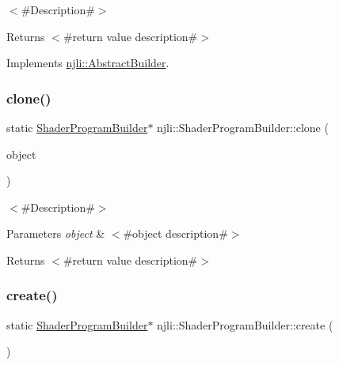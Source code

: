 $<$\#\+Description\#$>$

\begin{DoxyReturn}{Returns}
$<$\#return value description\#$>$ 
\end{DoxyReturn}


Implements \mbox{\hyperlink{classnjli_1_1_abstract_builder_aa1d220053e182c37b31b427499c6eacf}{njli\+::\+Abstract\+Builder}}.

\mbox{\label{classnjli_1_1_shader_program_builder_a539760d31d54d1c95c2fffc4c3fc3fbb}} 
\subsubsection{\texorpdfstring{clone()}{clone()}}
{\footnotesize\ttfamily static \mbox{\hyperlink{classnjli_1_1_shader_program_builder}{Shader\+Program\+Builder}}$\ast$ njli\+::\+Shader\+Program\+Builder\+::clone (\begin{DoxyParamCaption}\item[{const \mbox{\hyperlink{classnjli_1_1_shader_program_builder}{Shader\+Program\+Builder}} \&}]{object }\end{DoxyParamCaption})\hspace{0.3cm}{\ttfamily [static]}}

$<$\#\+Description\#$>$


\begin{DoxyParams}{Parameters}
{\em object} & $<$\#object description\#$>$\\
\hline
\end{DoxyParams}
\begin{DoxyReturn}{Returns}
$<$\#return value description\#$>$ 
\end{DoxyReturn}
\mbox{\label{classnjli_1_1_shader_program_builder_a29db7e71179718d1d22c76b4cd3db023}} 
\subsubsection{\texorpdfstring{create()}{create()}}
{\footnotesize\ttfamily static \mbox{\hyperlink{classnjli_1_1_shader_program_builder}{Shader\+Program\+Builder}}$\ast$ njli\+::\+Shader\+Program\+Builder\+::create (\begin{DoxyParamCaption}{ }\end{DoxyParamCaption})\hspace{0.3cm}{\ttfamily [static]}}

